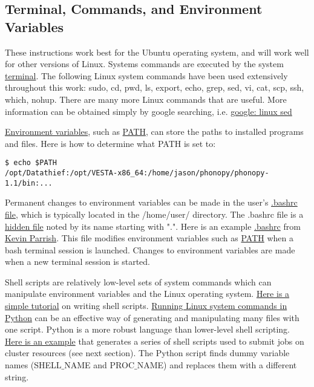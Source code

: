 \subsection{\label{A:Comp_Env:Term}
Terminal, Commands, and Environment Variables}

These instructions work best for the Ubuntu operating system, and will work 
well for other versions of Linux. Systems commands are executed by the 
system 
\href{https://help.ubuntu.com/community/UsingTheTerminal}{terminal}. 
The following Linux system commands have been used extensively throughout 
this work: sudo, cd, pwd, ls, export, echo, grep, sed, vi, cat, 
scp, ssh, which, nohup. 
There are many more Linux commands that are useful. More information can 
be obtained simply by google searching, i.e. 
\href{https://www.google.com/search?q=linux+sed}
{google: linux sed} 

\href{http://en.wikipedia.org/wiki/Environment_variable}{Environment variables}, 
such as 
\href{http://en.wikipedia.org/wiki/PATH_(variable)}{PATH}, 
can store the paths to installed programs and files. 
Here is how to determine what PATH is set to:
\begin{lstlisting}
$ echo $PATH
/opt/Datathief:/opt/VESTA-x86_64:/home/jason/phonopy/phonopy-1.1/bin:...
\end{lstlisting}
Permanent changes to environment variables can be made in the user's 
\href{https://www.gnu.org/software/bash/manual/html_node/Bash-Startup-Files.html}
{.bashrc file}, which is typically located in the /home/user/ directory. 
The .bashrc file is a 
\href{http://www.ghacks.net/2009/04/16/linux-tips-view-hidden-files/}{hidden file} 
noted by its name starting with ".". 
Here is an example 
\href{https://gist.github.com/kparrish/6064111}{.bashrc} from 
\href{https://github.com/kparrish}{Kevin Parrish}. 
This file modifies environment variables such as 
\href{https://help.ubuntu.com/community/EnvironmentVariables}{PATH}  
when a bash terminal session is launched. Changes to environment 
variables are made when a new terminal session is started. 

Shell scripts are relatively low-level sets of system commands 
which can manipulate environment variables 
and the Linux operating system. 
\href{http://linuxcommand.org/wss0010.php}{Here is a simple tutorial} 
on writing shell scripts. 
\href{http://docs.python.org/2/library/os.html}
{Running Linux system commands in Python} can be an effective way of 
generating and manipulating many files with one script. Python 
is a more robust language than lower-level shell scripting. 
\href{https://github.com/ntpl/ntpy/blob/master/examples/thesis/run.lammps.py}
{Here is an example} that generates a series of shell scripts used to 
submit jobs on cluster resources (see next section). The Python script 
finds dummy variable names (SHELL$\_$NAME and PROC$\_$NAME) and replaces them 
with a different string. 

